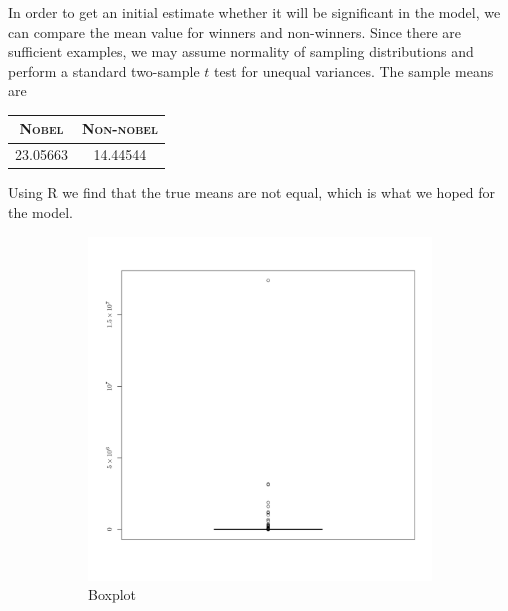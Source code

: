In order to get an initial estimate whether it will be significant in the model, we can compare the mean value for winners and non-winners. Since there are sufficient examples, we may assume normality of sampling distributions and perform a standard two-sample $t$ test for unequal variances. The sample means are 
\begin{table}[H]
\centering
\begin{tabular}{c|c}
\textbf{\textsc{Nobel}} & \textbf{\textsc{Non-nobel}} \\ \hline
\rule{0pt}{4mm}23.05663&14.44544\\
\end{tabular}
\end{table}
Using R we find that the true means are not equal, which is what we hoped for the model.
\begin{figure}
    \centering
    \begin{subfigure}[b]{0.4\textwidth}
        \includegraphics[width=\textwidth]{figures/popuInitialBox.pdf}
        \caption{Boxplot}
        \label{fig:popuInitialBox}
    \end{subfigure}
    ~
    \begin{subfigure}[b]{0.4\textwidth}

\end{subfigure}
\end{figure}
